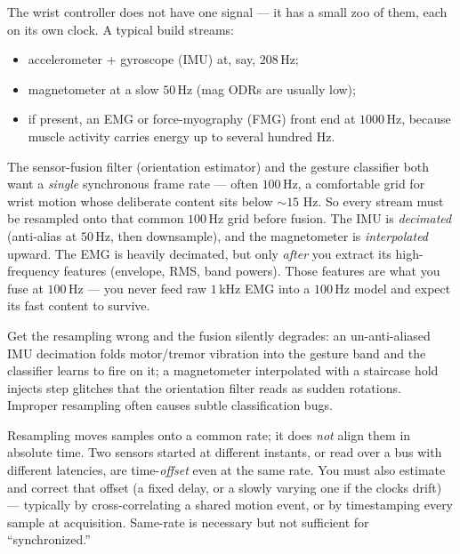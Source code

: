 \begin{goalbox}
The wrist controller does not have one signal --- it has a small zoo of them,
each on its own clock. A typical build streams:
\begin{itemize}
  \item accelerometer + gyroscope (IMU) at, say, $208$\,Hz;
  \item magnetometer at a slow $50$\,Hz (mag ODRs are usually low);
  \item if present, an EMG or force-myography (FMG) front end at $1000$\,Hz,
  because muscle activity carries energy up to several hundred Hz.
\end{itemize}
The sensor-fusion filter (orientation estimator) and the gesture classifier both
want a \emph{single} synchronous frame rate --- often $100$\,Hz, a comfortable
grid for wrist motion whose deliberate content sits below $\sim 15$ Hz. So every
stream must be resampled onto that common $100$\,Hz grid before fusion. The IMU is
\emph{decimated} (anti-alias at $50$\,Hz, then downsample), and the magnetometer is
\emph{interpolated} upward. The EMG is heavily decimated, but only \emph{after} you
extract its high-frequency features (envelope, RMS, band powers).
Those features are what you fuse at $100$\,Hz --- you never feed raw
$1$\,kHz EMG into a $100$\,Hz model and expect its fast content to survive.

Get the resampling wrong and the fusion silently degrades: an un-anti-aliased IMU
decimation folds motor/tremor vibration into the gesture band and the classifier
learns to fire on it; a magnetometer interpolated with a staircase hold injects
step glitches that the orientation filter reads as sudden rotations. Improper resampling often causes subtle classification bugs.
\end{goalbox}

\begin{trapbox}
Resampling moves samples onto a common rate; it does \emph{not} align them in
absolute time. Two sensors started at different instants, or read over a bus with
different latencies, are time-\emph{offset} even at the same rate. You must also
estimate and correct that offset (a fixed delay, or a slowly varying one if the
clocks drift) --- typically by cross-correlating a shared motion event, or by
timestamping every sample at acquisition. Same-rate is necessary but not
sufficient for ``synchronized.''
\end{trapbox}

